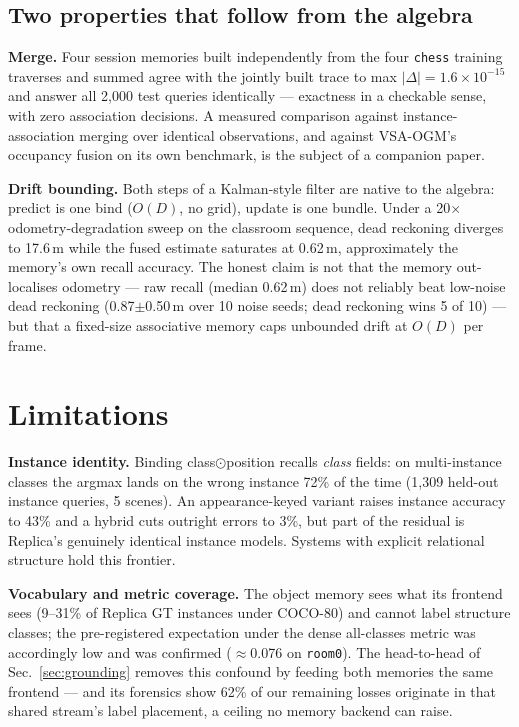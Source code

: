 \documentclass[conference]{IEEEtran}
\newcommand{\bnd}{\odot}
\begin{document}
\subsection{Two properties that follow from the algebra}
\label{sec:merge-results}

\textbf{Merge.} Four session memories built independently from the four
\texttt{chess} training traverses and summed agree with the jointly built
trace to max $|\Delta| = 1.6\times10^{-15}$ and answer all 2{,}000 test
queries identically --- exactness in a checkable sense, with zero
association decisions.
A measured comparison against instance-association merging over identical
observations, and against VSA-OGM's occupancy fusion on its own
benchmark, is the subject of a companion paper.

\textbf{Drift bounding.} Both steps of a Kalman-style filter are native
to the algebra: predict is one bind ($O(D)$, no grid), update is one
bundle. Under a 20$\times$ odometry-degradation sweep on the classroom
sequence, dead reckoning diverges to 17.6\,m while the fused estimate
saturates at 0.62\,m, approximately the memory's own recall accuracy.
The honest claim is not that the memory out-localises odometry --- raw
recall (median 0.62\,m) does not reliably beat low-noise dead reckoning
(0.87$\pm$0.50\,m over 10 noise seeds; dead reckoning wins 5 of 10) ---
but that a fixed-size associative memory caps unbounded drift at $O(D)$
per frame.

\section{Limitations}
\label{sec:limitations}

\textbf{Instance identity.} Binding class$\bnd$position recalls
\emph{class} fields: on multi-instance classes the argmax lands on the
wrong instance 72\% of the time (1{,}309 held-out instance queries, 5
scenes). An appearance-keyed variant raises instance accuracy to 43\% and
a hybrid cuts outright errors to 3\%, but part of the residual is
Replica's genuinely identical instance models. Systems with explicit
relational structure \cite{farm2026} hold this frontier.

\textbf{Vocabulary and metric coverage.} The object memory sees what its
frontend sees (9--31\% of Replica GT instances under COCO-80) and cannot
label structure classes; the pre-registered expectation under the dense
all-classes metric was accordingly low and was confirmed
($\approx$0.076 on \texttt{room0}). The head-to-head of
Sec.~\ref{sec:grounding} removes this confound by feeding both memories
the same frontend --- and its forensics show 62\% of our remaining
losses originate in that shared stream's label placement, a ceiling no
memory backend can raise.
\end{document}
